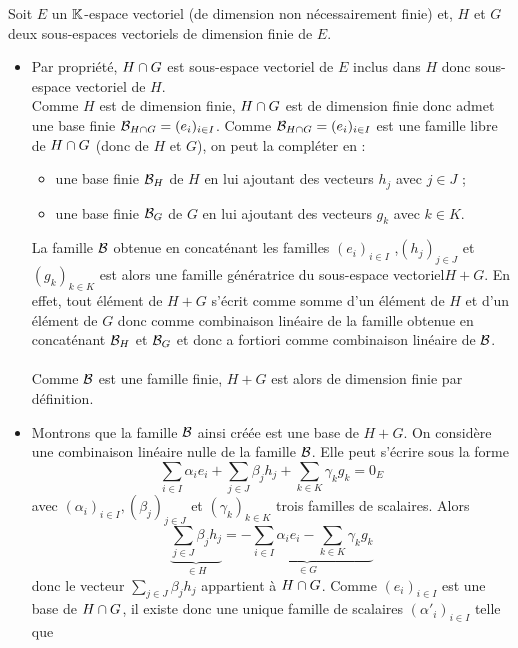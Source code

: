 \begin{dem}
    Soit \(E\) un \(\K\)-espace vectoriel (de dimension non nécessairement finie) et, \(H\) et \(G\) deux sous-espaces vectoriels de dimension finie de \(E\).
    \begin{itemize}
        \item Par propriété, \(H \inter G\) est sous-espace vectoriel de \(E\) inclus dans \(H\) donc sous-espace vectoriel de \(H\).\\
            Comme \(H\) est de dimension finie, \(H \inter G\) est de dimension finie donc admet une base finie \(\cal{B}_{H\inter G} = (e_i)_{i\in I}\).
            Comme \(\cal{B}_{H \inter G} = (e_i)_{i\in I}\) est une famille libre de \(H \inter G\) (donc de \(H\) et \(G\)), on peut la compléter en :
            \begin{itemize}
                \item une base finie \(\cal{B}_H\) de \(H\) en lui ajoutant des vecteurs \(h_j\) avec \(j \in J\) ;
                \item une base finie \(\cal{B}_G\) de \(G\) en lui ajoutant des vecteurs \(g_k\) avec \(k \in K\).
            \end{itemize}
            La famille \(\cal{B}\) obtenue en concaténant les familles \((e_i)_{i\in I}\) ,\((h_j )_{j\in J}\) et \((g_k)_{k\in K}\) est alors une famille génératrice du sous-espace vectoriel\( H + G\). En effet, tout élément de \(H + G\) s’écrit comme somme d’un élément de \(H\) et d’un élément de \(G\) donc comme combinaison linéaire de la famille obtenue en concaténant \(\cal{B}_H\) et \(\cal{B}_G\) et donc a fortiori comme combinaison linéaire de \(\cal{B}\).\\~\\
            Comme \(\cal{B}\) est une famille finie, \(H + G\) est alors de dimension finie par définition.
        \item Montrons que la famille \(\cal{B}\) ainsi créée est une base de \(H + G\).
            On considère une combinaison linéaire nulle de la famille \(\cal{B}\). Elle peut s’écrire sous la forme
            \[\sum_{i\in I}\alpha_ie_i + \sum_{j\in J}\beta_j h_j + \sum_{k\in K} \gamma_kg_k = 0_E \]
            avec \((\alpha_i)_{i\in I} ,(\beta_j )_{j\in J}\) et \((\gamma_k)_{k\in K}\) trois familles de scalaires.
            Alors 
            \[\underbrace{\sum_{j\in J}\beta_j h_j}_{\in H} = \underbrace{-\sum_{i\in I} \alpha_ie_i - \sum_{k\in K}\gamma_kg_k}_{\in G}\]
            donc le vecteur \(\sum_{j\in J} \beta_j h_j\) appartient à \(H \inter G\). Comme \((e_i)_{i\in I}\) est une base de \(H \inter G\), il existe donc une unique famille de scalaires \((\alpha'_i)_{i\in I}\) telle que

\end{itemize}
\end{dem}
